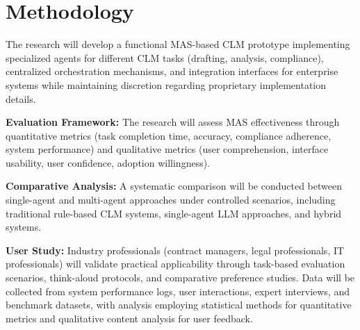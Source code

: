 
\chapter{Methodology}\label{chapter:methodology}

The research will develop a functional MAS-based CLM prototype implementing specialized agents for different CLM tasks (drafting, analysis, compliance), centralized orchestration mechanisms, and integration interfaces for enterprise systems while maintaining discretion regarding proprietary implementation details.

\textbf{Evaluation Framework:} The research will assess MAS effectiveness through quantitative metrics (task completion time, accuracy, compliance adherence, system performance) and qualitative metrics (user comprehension, interface usability, user confidence, adoption willingness).

\textbf{Comparative Analysis:} A systematic comparison will be conducted between single-agent and multi-agent approaches under controlled scenarios, including traditional rule-based CLM systems, single-agent LLM approaches, and hybrid systems.

\textbf{User Study:} Industry professionals (contract managers, legal professionals, IT professionals) will validate practical applicability through task-based evaluation scenarios, think-aloud protocols, and comparative preference studies. Data will be collected from system performance logs, user interactions, expert interviews, and benchmark datasets, with analysis employing statistical methods for quantitative metrics and qualitative content analysis for user feedback.
